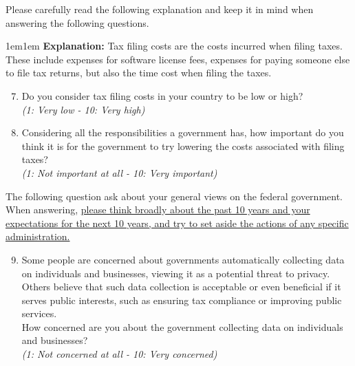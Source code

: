 \documentclass{beamer}
\begin{document}
\begin{frame}[allowframebreaks]
\noindent Please carefully read the following explanation and keep it in mind when answering the following questions. \\[0.5em]
\begin{adjustwidth}{1em}{1em} \textbf{Explanation:} Tax filing costs are the costs incurred when filing taxes. These include expenses for software license fees, expenses for paying someone else to file tax returns, but also the time cost when filing the taxes. 
\end{adjustwidth}
\begin{enumerate}
    \setcounter{enumi}{6}
    \item Do you consider tax filing costs in your country to be low or high?\\ 
    \textit{(1: Very low - 10: Very high)}
    \item Considering all the responsibilities a government has, how important do you think it is for the government to try lowering the costs associated with filing taxes? \\ \textit{(1: Not important at all - 10: Very important)}
\end{enumerate}
The following question ask about your general views on the federal government. When answering, \uline{please think broadly about the past 10 years and your expectations for the next 10 years, and try to set aside the actions of any specific administration.}

\begin{enumerate}
    \setcounter{enumi}{8}
    \item Some people are concerned about governments automatically collecting data on individuals and businesses, viewing it as a potential threat to privacy. Others believe that such data collection is acceptable or even beneficial if it serves public interests, such as ensuring tax compliance or improving public services. \\ How concerned are you about the government collecting data on individuals and businesses?\\
    \textit{(1: Not concerned at all - 10: Very concerned)}
\end{enumerate}
\hfill
\hyperlink{General_Considerations}{}
\end{frame}
\end{document}
